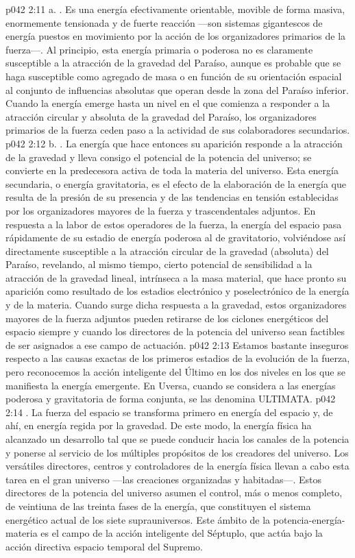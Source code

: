\vs p042 2:11 \pc a. . Es una energía efectivamente orientable, movible de forma masiva, enormemente tensionada y de fuerte reacción ---son sistemas gigantescos de energía puestos en movimiento por la acción de los organizadores primarios de la fuerza---. Al principio, esta energía primaria o poderosa no es claramente susceptible a la atracción de la gravedad del Paraíso, aunque es probable que se haga susceptible como agregado de masa o en función de su orientación espacial al conjunto de influencias absolutas que operan desde la zona del Paraíso inferior. Cuando la energía emerge hasta un nivel en el que comienza a responder a la atracción circular y absoluta de la gravedad del Paraíso, los organizadores primarios de la fuerza ceden paso a la actividad de sus colaboradores secundarios.
\vs p042 2:12 \pc b. . La energía que hace entonces su aparición responde a la atracción de la gravedad y lleva consigo el potencial de la potencia del universo; se convierte en la predecesora activa de toda la materia del universo. Esta energía secundaria, o energía gravitatoria, es el efecto de la elaboración de la energía que resulta de la presión de su presencia y de las tendencias en tensión establecidas por los organizadores mayores de la fuerza y trascendentales adjuntos. En respuesta a la labor de estos operadores de la fuerza, la energía del espacio pasa rápidamente de su estadio de energía poderosa al de gravitatorio, volviéndose así directamente susceptible a la atracción circular de la gravedad (absoluta) del Paraíso, revelando, al mismo tiempo, cierto potencial de sensibilidad a la atracción de la gravedad lineal, intrínseca a la masa material, que hace pronto su aparición como resultado de los estadios electrónico y poselectrónico de la energía y de la materia. Cuando surge dicha respuesta a la gravedad, estos organizadores mayores de la fuerza adjuntos pueden retirarse de los ciclones energéticos del espacio siempre y cuando los directores de la potencia del universo sean factibles de ser asignados a ese campo de actuación.
\vs p042 2:13 \pc Estamos bastante inseguros respecto a las causas exactas de los primeros estadios de la evolución de la fuerza, pero reconocemos la acción inteligente del Último en los dos niveles en los que se manifiesta la energía emergente. En Uversa, cuando se considera a las energías poderosa y gravitatoria de forma conjunta, se las denomina ULTIMATA.
\vs p042 2:14 . La fuerza del espacio se transforma primero en energía del espacio y, de ahí, en energía regida por la gravedad. De este modo, la energía física ha alcanzado un desarrollo tal que se puede conducir hacia los canales de la potencia y ponerse al servicio de los múltiples propósitos de los creadores del universo. Los versátiles directores, centros y controladores de la energía física llevan a cabo esta tarea en el gran universo ---las creaciones organizadas y habitadas---. Estos directores de la potencia del universo asumen el control, más o menos completo, de veintiuna de las treinta fases de la energía, que constituyen el sistema energético actual de los siete suprauniversos. Este ámbito de la potencia\hyp{}energía\hyp{}materia es el campo de la acción inteligente del Séptuplo, que actúa bajo la acción directiva espacio temporal del Supremo.
